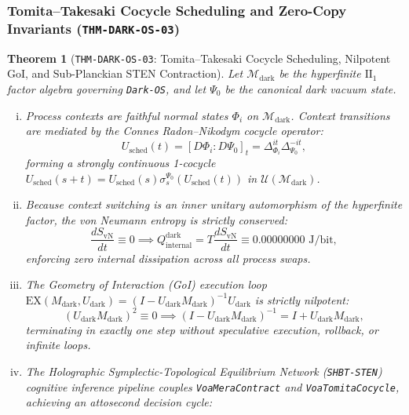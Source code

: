 \documentclass[11pt,onecolumn]{article}
\newtheorem{theorem}{Theorem}
\begin{document}
\subsubsection{Tomita--Takesaki Cocycle Scheduling and Zero-Copy Invariants (\texttt{THM-DARK-OS-03})}
\label{subsubsec:thm_dark_os_03}

\begin{theorem}[\texttt{THM-DARK-OS-03}: Tomita--Takesaki Cocycle Scheduling, Nilpotent GoI, and Sub-Planckian STEN Contraction]
Let $\mathcal{M}_{\text{dark}}$ be the hyperfinite $\mathrm{II}_1$ factor algebra governing \texttt{Dark-OS}, and let $\Psi_0$ be the canonical dark vacuum state.
\begin{enumerate}[(i)]
    \item Process contexts are faithful normal states $\Phi_i$ on $\mathcal{M}_{\text{dark}}$. Context transitions are mediated by the Connes Radon--Nikodym cocycle operator:
    \begin{equation}
    U_{\text{sched}}(t) = [D\Phi_i : D\Psi_0]_t = \Delta_{\Phi_i}^{it} \Delta_{\Psi_0}^{-it},
    \label{eq:thm_dark_os_03_cocycle}
    \end{equation}
    forming a strongly continuous 1-cocycle $U_{\text{sched}}(s+t) = U_{\text{sched}}(s) \sigma_s^{\Psi_0}(U_{\text{sched}}(t))$ in $\mathcal{U}(\mathcal{M}_{\text{dark}})$.
    \item Because context switching is an inner unitary automorphism of the hyperfinite factor, the von Neumann entropy is strictly conserved:
    \begin{equation}
    \frac{d S_{\text{vN}}}{dt} \equiv 0 \implies Q_{\text{internal}}^{\text{dark}} = T \frac{d S_{\text{vN}}}{dt} \equiv 0.00000000\text{ J/bit},
    \label{eq:thm_dark_os_03_dissipation}
    \end{equation}
    enforcing zero internal dissipation across all process swaps.
    \item The Geometry of Interaction (GoI) execution loop $\mathrm{EX}(M_{\text{dark}}, U_{\text{dark}}) = (I - U_{\text{dark}} M_{\text{dark}})^{-1} U_{\text{dark}}$ is strictly nilpotent:
    \begin{equation}
    (U_{\text{dark}} M_{\text{dark}})^2 \equiv 0 \implies (I - U_{\text{dark}} M_{\text{dark}})^{-1} = I + U_{\text{dark}} M_{\text{dark}},
    \label{eq:thm_dark_os_03_goi}
    \end{equation}
    terminating in exactly one step without speculative execution, rollback, or infinite loops.
    \item The Holographic Symplectic-Topological Equilibrium Network (\texttt{SHBT-STEN}) cognitive inference pipeline couples \texttt{VoaMeraContract} and \texttt{VoaTomitaCocycle}, achieving an attosecond decision cycle:

\end{enumerate}
\end{theorem}
\end{document}
